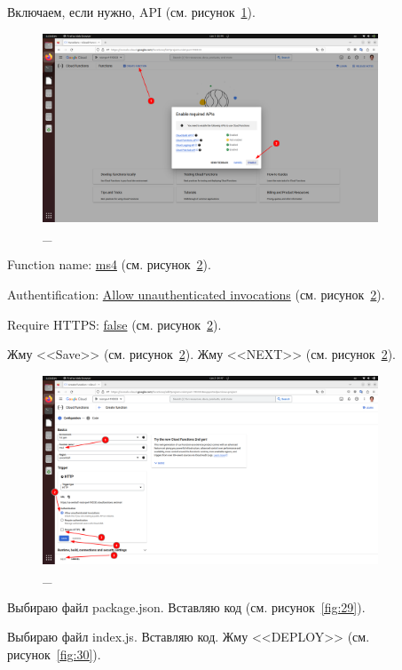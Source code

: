 \documentclass[12pt, a4paper, simple]{eskdtext}
\begin{document}
  Включаем, если нужно, API (см. рисунок~\ref{fig:27}).

  \begin{figure}[!h]
    \centering
    \includegraphics[width=10cm]
    {images/GoogleCloudFunctions/2023-03-01_05-44-49.png}
    \caption{\_}
    \label{fig:27}
  \end{figure}

  \newpage
  Function name: \underline{ms4} (см. рисунок~\ref{fig:28}).

  Authentification: \underline{Allow unauthenticated invocations} (см. рисунок~\ref{fig:28}).

  Require HTTPS: \underline{false} (см. рисунок~\ref{fig:28}).

  Жму <<Save>> (см. рисунок~\ref{fig:28}).
  Жму <<NEXT>> (см. рисунок~\ref{fig:28}).

  \begin{figure}[!h]
    \centering
    \includegraphics[width=10cm]
    {images/GoogleCloudFunctions/2023-03-02_04-48-52.png}
    \caption{\_}
    \label{fig:28}
  \end{figure}

  Выбираю файл package.json. Вставляю код (см. рисунок~\ref{fig:29}).

  Выбираю файл index.js. Вставляю код. Жму <<DEPLOY>> (см. рисунок~\ref{fig:30}).
\end{document}
